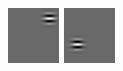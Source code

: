 \documentclass[a4paper,10pt]{article}
\begin{document}
\begin{figure}[ht]
 \includegraphics[width=\textwidth*11/100]{figures/firstgabor_Full_1.png}
 \includegraphics[width=\textwidth*11/100]{figures/firstgabor_Full_2.png}

\end{figure}
\end{document}
